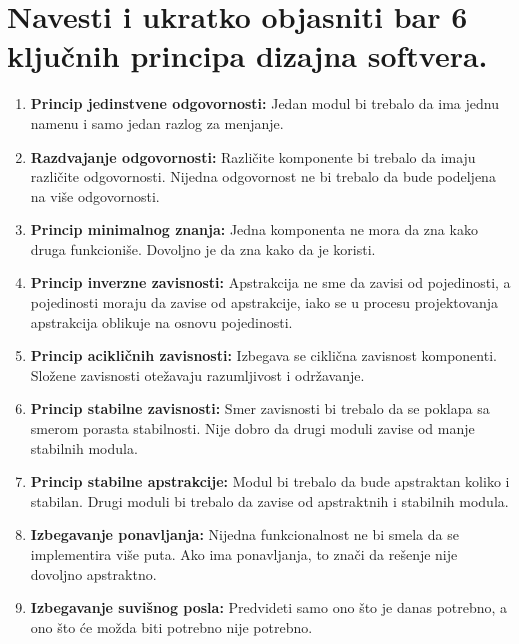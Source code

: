 \documentclass[a4paper]{article}
\begin{document}
\section{Navesti i ukratko objasniti bar 6 ključnih principa dizajna softvera.}
  \begin{enumerate}
    \item \textbf{Princip jedinstvene odgovornosti:} Jedan modul bi trebalo da ima
          jednu namenu i samo jedan razlog za menjanje.
    \item \textbf{Razdvajanje odgovornosti:} Različite komponente bi trebalo da imaju različite
          odgovornosti. Nijedna odgovornost ne bi trebalo da bude podeljena na više odgovornosti.
    \item \textbf{Princip minimalnog znanja:} Jedna komponenta ne mora da zna kako druga funkcioniše.
          Dovoljno je da zna kako da je koristi.
    \item \textbf{Princip inverzne zavisnosti:} Apstrakcija ne sme da zavisi od pojedinosti, a
          pojedinosti moraju da zavise od apstrakcije, iako se u procesu projektovanja
          apstrakcija oblikuje na osnovu pojedinosti.
    \item \textbf{Princip acikličnih zavisnosti:} Izbegava se ciklična zavisnost komponenti.
          Složene zavisnosti otežavaju razumljivost i održavanje.
    \item \textbf{Princip stabilne zavisnosti:} Smer zavisnosti bi trebalo da se poklapa sa smerom
          porasta stabilnosti. Nije dobro da drugi moduli zavise od manje stabilnih modula.
    \item \textbf{Princip stabilne apstrakcije:} Modul bi trebalo da bude apstraktan koliko i stabilan.
          Drugi moduli bi trebalo da zavise od apstraktnih i stabilnih modula. 
    \item \textbf{Izbegavanje ponavljanja:} Nijedna funkcionalnost ne bi smela da se implementira
          više puta. Ako ima ponavljanja, to znači da rešenje nije dovoljno apstraktno.
    \item \textbf{Izbegavanje suvišnog posla:} Predvideti samo ono što je danas potrebno, a
          ono što će možda biti potrebno nije potrebno.
  \end{enumerate}
\end{document}
